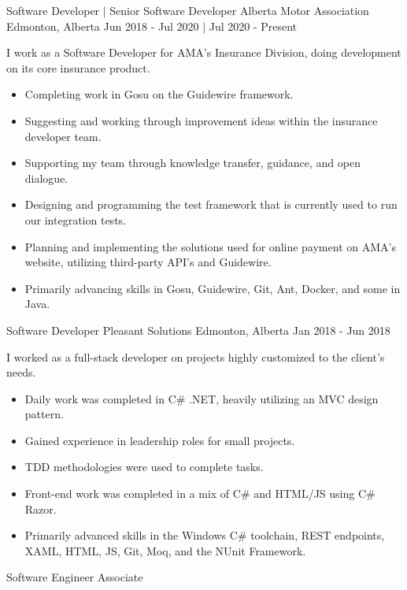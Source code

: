 
\begin{cventries}
    \cventry
        {Software Developer | Senior Software Developer}
        {Alberta Motor Association}
        {Edmonton, Alberta}
        {Jun 2018 - Jul 2020 | Jul 2020 - Present}
        {
            I work as a Software Developer for AMA’s Insurance Division, doing development on its core insurance product.
            \begin{itemize}
                \item Completing work in Gosu on the Guidewire framework.
                \item Suggesting and working through improvement ideas within the insurance developer team.
                \item Supporting my team through knowledge transfer, guidance, and open dialogue.
                \item Designing and programming the test framework that is currently used to run our integration tests.
                \item Planning and implementing the solutions used for online payment on AMA’s website, utilizing third-party API’s and Guidewire.
                \item Primarily advancing skills in Gosu, Guidewire, Git, Ant, Docker, and some in Java.
            \end{itemize}
        }
    \cventry
        {Software Developer}
        {Pleasant Solutions}
        {Edmonton, Alberta}
        {Jan 2018 - Jun 2018}
        {
            I worked as a full-stack developer on projects highly customized to the client’s needs.
            \begin{itemize}
                \item Daily work was completed in C\# .NET, heavily utilizing an MVC design pattern.
                \item Gained experience in leadership roles for small projects.
                \item TDD methodologies were used to complete tasks.
                \item Front-end work was completed in a mix of C\# and HTML/JS using C\# Razor.
                \item Primarily advanced skills in the Windows C\# toolchain, REST endpoints, XAML, HTML, JS, Git, Moq, and the NUnit Framework.
            \end{itemize}
        }
    \cventry
        {Software Engineer Associate}

\end{cventries}

